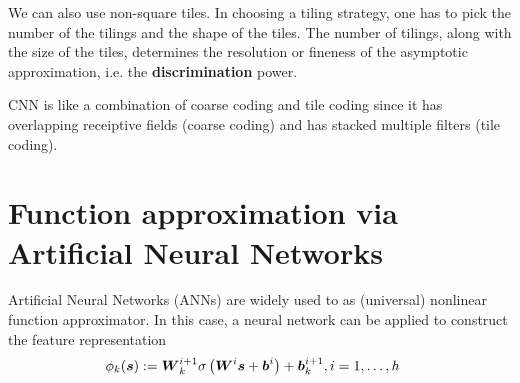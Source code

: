 \documentclass[11pt]{article}
\begin{document}
\begin{itemize}
We can also use non-square tiles. In choosing a tiling strategy, one has to pick the number of the tilings and the shape of the tiles. The number of tilings, along with the size of the tiles, determines the resolution or fineness of the asymptotic approximation, i.e. the \textbf{discrimination} power.

CNN is like a combination of coarse coding and tile coding since it has overlapping receiptive fields (coarse coding) and has stacked multiple filters (tile coding). 

\end{itemize}

\section{Function approximation via Artificial Neural Networks}
Artificial Neural Networks (ANNs) are widely used to as (universal) nonlinear function approximator. In this case, a neural network can be applied to construct the feature representation 
\begin{align*}
\phi_{k}(\boldsymbol{s}) &:= \boldsymbol{W}_{k}^{i+1}\sigma\left(\boldsymbol{W}^{i}\boldsymbol{s} + \boldsymbol{b}^{i}\right) + \boldsymbol{b}_{k}^{i+1}, i=1,\ldots, h
\end{align*} 
\end{document}
